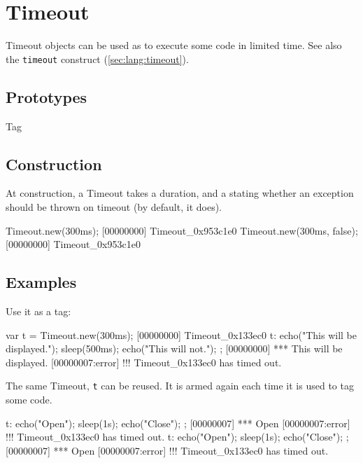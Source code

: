 
\section{Timeout}

Timeout objects can be used as  to execute some code in
limited time.  See also the \lstinline|timeout| construct
(\autoref{sec:lang:timeout}).

\subsection{Prototypes}
\begin{refObjects}
\item[Tag]
\end{refObjects}

\subsection{Construction}
At construction, a Timeout takes a duration, and a 
stating whether an exception should be thrown on timeout (by default,
it does).

\begin{urbiscript}
Timeout.new(300ms);
[00000000] Timeout_0x953c1e0
Timeout.new(300ms, false);
[00000000] Timeout_0x953c1e0
\end{urbiscript}

\subsection{Examples}

Use it as a tag:

\begin{urbiscript}
var t = Timeout.new(300ms);
[00000000] Timeout_0x133ec0
t:{
  echo("This will be displayed.");
  sleep(500ms);
  echo("This will not.");
};
[00000000] *** This will be displayed.
[00000007:error] !!! Timeout_0x133ec0 has timed out.
\end{urbiscript}

The same Timeout, \lstinline|t| can be reused.  It is armed again each
time it is used to tag some code.

\begin{urbiscript}
t: { echo("Open"); sleep(1s); echo("Close"); };
[00000007] *** Open
[00000007:error] !!! Timeout_0x133ec0 has timed out.
t: { echo("Open"); sleep(1s); echo("Close"); };
[00000007] *** Open
[00000007:error] !!! Timeout_0x133ec0 has timed out.
\end{urbiscript}

